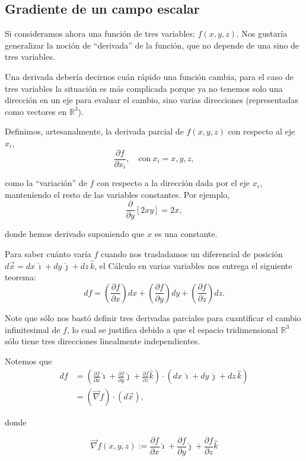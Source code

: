 \subsection*{Gradiente de un campo escalar}

Si consideramos ahora una función de tres variables: $f(x,y,z)$. Nos gustaría generalizar la noción de “derivada” de la función, que no depende de una sino de tres variables.

Una derivada debería decirnos cuán rápido una función cambia, para el caso de tres variables la situación es más complicada porque ya no tenemos solo una dirección en un eje para evaluar el cambio, sino varias direcciones (representadas como vectores en $\mathbb{R}^3$). 

Definimos, artesanalmente, la derivada parcial de $f(x,y,z)$ con respecto al eje $x_i$,
$$\frac{\partial f}{\partial x_i}, \quad \text{con} ~ x_i = x,y,z,$$

como la “variación” de $f$ con respecto a la dirección dada por el eje $x_i$, manteniendo el resto de las variables constantes. Por ejemplo, 
$$\frac{\partial}{\partial y}[2xy] = 2x,$$

donde hemos derivado suponiendo que $x$ es una constante.

Para saber cuánto varía $f$ cuando nos trasladamos un diferencial de posición $d\Vec{x} = dx \, \hat{\imath} + dy \,\hat{\jmath} + dz \,\hat{k}$, el Cálculo en varias variables nos entrega el siguiente teorema:
$$df = \left(\frac{\partial f}{\partial x}\right) dx + \left(\frac{\partial f}{\partial y}\right) dy +\left(\frac{\partial f}{\partial z}\right) dz.$$

Note que sólo nos bastó definir tres derivadas parciales para cuantificar el cambio infinitesimal de $f$, lo cual se justifica debido a que el espacio tridimensional $\mathbb{R}^3$ sólo tiene tres direcciones linealmente independientes.

Notemos que 
\begin{align*}
    df &= \left( \frac{\partial f}{\partial x} \hat{\imath} +  \frac{\partial f}{\partial y} \hat{\jmath} +  \frac{\partial f}{\partial z} \hat{k}\right)  \cdot (dx \, \hat{\imath} + dy \, \hat{\jmath} + dz \, \hat{k})\\
    &= (\Vec{\nabla} f) \cdot (d\Vec{x}),
\end{align*}

donde 
\begin{shaded}
$$\vec{\nabla}f(x,y,z) := \frac{\partial f}{\partial x} \hat{\imath} + \frac{\partial f}{\partial y} \hat{\jmath} +  \frac{\partial f}{\partial z} \hat{k}$$
\end{shaded}

